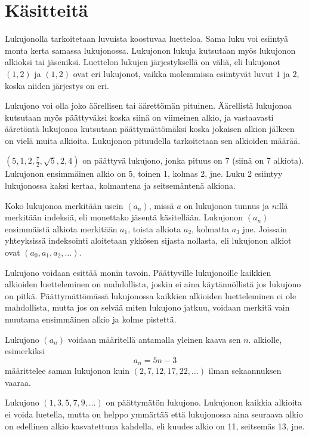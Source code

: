 \section{Käsitteitä}


Lukujonolla tarkoitetaan luvuista koostuvaa luetteloa. Sama luku voi esiintyä monta kerta samassa lukujonossa. Lukujonon lukuja kutsutaan myös lukujonon alkioksi tai jäseniksi. Luettelon lukujen järjestyksellä on väliä, eli lukujonot $(1, 2)$ ja $(1, 2)$ ovat eri lukujonot, vaikka molemmissa esiintyvät luvut $1$ ja $2$, koska niiden järjestys on eri.

Lukujono voi olla joko äärellisen tai äärettömän pituinen. Äärellistä lukujonoa kutsutaan myös päättyväksi koska siinä on viimeinen alkio, ja vastaavasti ääretöntä lukujonoa kutsutaan päättymättömäksi koska jokaisen alkion jälkeen on vielä muita alkioita. Lukujonon pituudella tarkoitetaan sen alkioiden määrää.

\begin{esimerkki}
$(5, 1, 2, \frac{7}{2}, \sqrt{5}, 2, 4)$ on päättyvä lukujono, jonka pituus on 7 (siinä on 7 alkiota). Lukujonon ensimmäinen alkio on 5, toinen 1, kolmas 2, jne. Luku 2 esiintyy lukujonossa kaksi kertaa, kolmantena ja seitsemäntenä alkiona.
\end{esimerkki}

Koko lukujonoa merkitään usein $(a_n)$, missä $a$ on lukujonon tunnus ja $n$:llä merkitään indeksiä, eli monettako jäsentä käsitellään. Lukujonon $(a_n)$ ensimmäistä alkiota merkitään $a_1$, toista alkiota $a_2$, kolmatta $a_3$ jne. Joissain yhteyksissä indeksointi aloitetaan ykkösen sijasta nollasta, eli lukujonon alkiot ovat $(a_0, a_1, a_2, \ldots)$.

Lukujono voidaan esittää monin tavoin. Päättyville lukujonoille kaikkien alkioiden luetteleminen on mahdollista, joskin ei aina käytännöllistä jos lukujono on pitkä. Päättymättömässä lukujonossa kaikkien alkioiden luetteleminen ei ole mahdollista, mutta jos on selvää miten lukujono jatkuu, voidaan merkitä vain muutama ensimmäinen alkio ja kolme pistettä.

Lukujono $(a_n)$ voidaan määritellä antamalla yleinen kaava sen $n$. alkiolle, esimerkiksi
\[a_n = 5n - 3\]
määrittelee saman lukujonon kuin $(2, 7, 12, 17, 22, \ldots)$ ilman sekaannuksen vaaraa.

\begin{esimerkki}
Lukujono $(1, 3, 5, 7, 9, \ldots)$ on päättymätön lukujono. Lukujonon kaikkia alkioita ei voida luetella, mutta on helppo ymmärtää että lukujonossa aina seuraava alkio on edellinen alkio kasvatettuna kahdella, eli kuudes alkio on 11, seitsemäs 13, jne.
\end{esimerkki}

